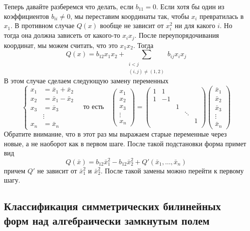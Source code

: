 Теперь давайте разберемся что делать, если $b_{11} = 0$.
Если хотя бы один из коэффициентов $b_{ii}\neq 0$, мы переставим координаты так, чтобы $x_i$ превратилась в $x_1$.
В противном случае $Q(x)$ вообще не зависит от $x_i^2$ ни для какого $i$.
Но тогда она должна зависеть от какого-то $x_i x_j$.
После переупорядочивания координат, мы можем считать, что это $x_1x_2$.
Тогда
\[
Q(x) = b_{12}x_1 x_2 + \sum_{\substack{i < j\\ (i, j)\neq (1, 2)}} b_{ij}x_i x_j
\]
В этом случае сделаем следующую замену переменных
\[
\left\{
\begin{aligned}
x_1 &= \bar x_1 + \bar x_2\\
x_2 &= \bar x_1 - \bar x_2\\
x_3 &= \bar x_3\\
&\vdots\\
x_n &= \bar x_n
\end{aligned}
\right.
\quad\text{то есть}\quad
\begin{pmatrix}
{x_1}\\{x_2}\\{x_3}\\{\vdots}\\{x_n}
\end{pmatrix}
=
\begin{pmatrix}
{1}&{1}&{}&{}&{}\\
{1}&{-1}&{}&{}&{}\\
{}&{}&{1}&{}&{}\\
{}&{}&{}&{\ddots}&{}\\
{}&{}&{}&{}&{1}\\
\end{pmatrix}
\begin{pmatrix}
{\bar x_1}\\{\bar x_2}\\{\bar x_3}\\{\vdots}\\{\bar x_n}
\end{pmatrix}
\]
Обратите внимание, что в этот раз мы выражаем старые переменные через новые, а не наоборот как в первом шаге.
После такой подстановки форма примет вид
\[
Q(\bar x) = b_{12}\bar x_1^2 - b_{12}\bar x_2^2 + Q'(\bar x_1,\ldots,\bar x_n)
\]
причем $Q'$ не зависит от $\bar x_1^2$ и $\bar x_2^2$.
После такой замены можно перейти к первому шагу.

\subsection{Классификация симметрических билинейных форм над алгебраически замкнутым полем}

